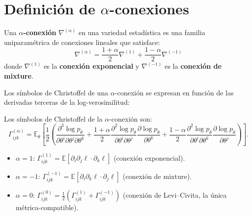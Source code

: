 \begin{center}
\end{center}

\section{Definición de $\alpha$-conexiones}

\begin{definition}
	Una \textbf{$\alpha$-conexión} $\nabla^{(\alpha)}$ en una variedad estadística es una familia uniparamétrica de conexiones lineales que satisface:
	\[
	\nabla^{(\alpha)} = \frac{1+\alpha}{2} \nabla^{(1)} + \frac{1-\alpha}{2} \nabla^{(-1)}
	\]
	donde $\nabla^{(1)}$ es la \textbf{conexión exponencial} y $\nabla^{(-1)}$ es la \textbf{conexión de mixture}.
\end{definition}

Los símbolos de Christoffel de una $\alpha$-conexión se expresan en función de las derivadas terceras de la log-verosimilitud:

\begin{definition}
	Los símbolos de Christoffel de la $\alpha$-conexión son:
	\[
	\Gamma^{(\alpha)}_{ijk} = \mathbb{E}_\theta\!\left[\frac{1}{2}\left(\frac{\partial^3 \log p_\theta}{\partial\theta^i \partial\theta^j \partial\theta^k}
	+ \frac{1+\alpha}{2} \frac{\partial^2 \log p_\theta}{\partial\theta^i \partial\theta^j}\frac{\partial \log p_\theta}{\partial\theta^k}
	+ \frac{1-\alpha}{2} \frac{\partial^2 \log p_\theta}{\partial\theta^i \partial\theta^k}\frac{\partial \log p_\theta}{\partial\theta^j}\right)\right].
	\]
\end{definition}

\begin{proposition}
	\begin{itemize}
		\item $\alpha = 1$: $\Gamma^{(1)}_{ijk} = \mathbb{E}[\partial_i \partial_j \ell \cdot \partial_k \ell]$ (conexión exponencial).
		\item $\alpha = -1$: $\Gamma^{(-1)}_{ijk} = \mathbb{E}[\partial_i \partial_k \ell \cdot \partial_j \ell]$ (conexión de mixture).
		\item $\alpha = 0$: $\Gamma^{(0)}_{ijk} = \frac{1}{2}(\Gamma^{(1)}_{ijk} + \Gamma^{(-1)}_{ijk})$ (conexión de Levi--Civita, la única métrica-compatible).
	\end{itemize}
\end{proposition}

